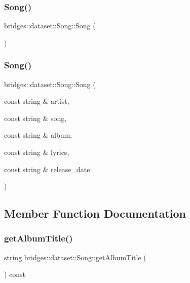 \subsubsection{\texorpdfstring{Song()}{Song()}\hspace{0.1cm}{\footnotesize\ttfamily [1/2]}}
{\footnotesize\ttfamily bridges\+::dataset\+::\+Song\+::\+Song (\begin{DoxyParamCaption}{ }\end{DoxyParamCaption})\hspace{0.3cm}{\ttfamily [inline]}}

\mbox{\label{classbridges_1_1dataset_1_1_song_a0938ada0b5596c874aa9254f1bde1275}} 
\subsubsection{\texorpdfstring{Song()}{Song()}\hspace{0.1cm}{\footnotesize\ttfamily [2/2]}}
{\footnotesize\ttfamily bridges\+::dataset\+::\+Song\+::\+Song (\begin{DoxyParamCaption}\item[{const string \&}]{artist,  }\item[{const string \&}]{song,  }\item[{const string \&}]{album,  }\item[{const string \&}]{lyrics,  }\item[{const string \&}]{release\+\_\+date }\end{DoxyParamCaption})\hspace{0.3cm}{\ttfamily [inline]}}



\subsection{Member Function Documentation}
\mbox{\label{classbridges_1_1dataset_1_1_song_a0bc005c3522a1ac6c36bbf721014cb07}} 
\subsubsection{\texorpdfstring{get\+Album\+Title()}{getAlbumTitle()}}
{\footnotesize\ttfamily string bridges\+::dataset\+::\+Song\+::get\+Album\+Title (\begin{DoxyParamCaption}{ }\end{DoxyParamCaption}) const\hspace{0.3cm}{\ttfamily [inline]}}

